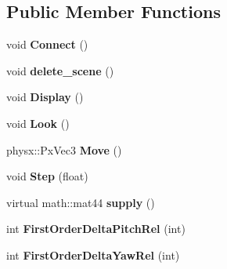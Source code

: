 \subsection*{Public Member Functions}
\begin{DoxyCompactItemize}
\item 
\hypertarget{classneb_1_1camera_1_1camera_a218cc11e01e31704f8da897c945d0e3f}{void {\bfseries Connect} ()}\label{classneb_1_1camera_1_1camera_a218cc11e01e31704f8da897c945d0e3f}

\item 
\hypertarget{classneb_1_1camera_1_1camera_a1648a17ee1479e429d6f642aa57245e9}{void {\bfseries delete\-\_\-scene} ()}\label{classneb_1_1camera_1_1camera_a1648a17ee1479e429d6f642aa57245e9}

\item 
\hypertarget{classneb_1_1camera_1_1camera_a1e6c6198d5b7bdd988b50a2b46b70385}{void {\bfseries Display} ()}\label{classneb_1_1camera_1_1camera_a1e6c6198d5b7bdd988b50a2b46b70385}

\item 
\hypertarget{classneb_1_1camera_1_1camera_a2c81ea18393516ad0e70316be6b17daf}{void {\bfseries Look} ()}\label{classneb_1_1camera_1_1camera_a2c81ea18393516ad0e70316be6b17daf}

\item 
\hypertarget{classneb_1_1camera_1_1camera_a8ce61b5956d05f57c23a9af81a8a3460}{physx\-::\-Px\-Vec3 {\bfseries Move} ()}\label{classneb_1_1camera_1_1camera_a8ce61b5956d05f57c23a9af81a8a3460}

\item 
\hypertarget{classneb_1_1camera_1_1camera_a962445a098d9fc97d17e62238b598fc1}{void {\bfseries Step} (float)}\label{classneb_1_1camera_1_1camera_a962445a098d9fc97d17e62238b598fc1}

\item 
\hypertarget{classneb_1_1camera_1_1camera_ae58f39bface93cd1949dd99ff6a72e00}{virtual math\-::mat44 {\bfseries supply} ()}\label{classneb_1_1camera_1_1camera_ae58f39bface93cd1949dd99ff6a72e00}

\item 
\hypertarget{classneb_1_1camera_1_1camera_a2afc49581aedd2419fbc15ff8b365a6f}{int {\bfseries First\-Order\-Delta\-Pitch\-Rel} (int)}\label{classneb_1_1camera_1_1camera_a2afc49581aedd2419fbc15ff8b365a6f}

\item 
\hypertarget{classneb_1_1camera_1_1camera_a1fd9fdc99f7de5a8a5fe418abb00e723}{int {\bfseries First\-Order\-Delta\-Yaw\-Rel} (int)}\label{classneb_1_1camera_1_1camera_a1fd9fdc99f7de5a8a5fe418abb00e723}


\end{DoxyCompactItemize}
